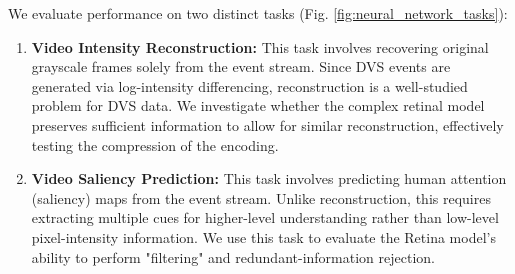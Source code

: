 \documentclass{article}
\begin{document}
We evaluate performance on two distinct tasks (Fig. \ref{fig:neural_network_tasks}):
\begin{enumerate}
    \item \textbf{Video Intensity Reconstruction:} This task involves recovering original grayscale frames solely from the event stream. Since DVS events are generated via log-intensity differencing, reconstruction is a well-studied problem for DVS data. We investigate whether the complex retinal model preserves sufficient information to allow for similar reconstruction, effectively testing the compression of the encoding. 
    \item \textbf{Video Saliency Prediction:} This task involves predicting human attention (saliency) maps from the event stream. Unlike reconstruction, this requires extracting multiple cues for higher-level understanding rather than low-level pixel-intensity information. We use this task to evaluate the Retina model's ability to perform "filtering" and redundant-information rejection. 
\end{enumerate}

\end{document}
